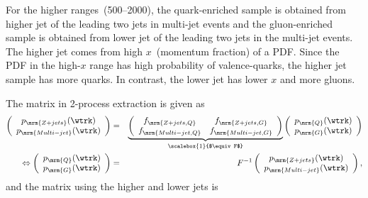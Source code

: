 For the higher \pt ranges~(500--2000\GeV), the quark-enriched sample is obtained from higher \abseta jet of the leading two jets in multi-jet events %
and the gluon-enriched sample is obtained from lower \abseta jet of the leading two jets in the multi-jet events. %
The higher \abseta jet comes from high $x$~(momentum fraction) of a PDF. %
Since the PDF in the high-$x$ range has high probability of valence-quarks, %
the higher \abseta jet sample has more quarks. %
In contrast, the lower \abseta jet has lower $x$ and more gluons. %

The matrix in 2-process extraction is given as 
\begin{eqnarray}
\label{eq:QG-matrix}
\left(\begin{array}{c} 
    p_{\mrm{Z+jets}}(\wtrk)\\ 
    p_{\mrm{Multi-jet}}(\wtrk)\\ 
    \end{array}\right)
    &=&
    \underbrace{
\left(\begin{array}{cc}
    f_{\mrm{Z+jets,Q}}&f_{\mrm{Z+jets,G}}\\
    f_{\mrm{Multi-jet,Q}}&f_{\mrm{Multi-jet,G}}\\
    \end{array}\right)
  }_{\scalebox{1}{$\equiv F$}}
\left(\begin{array}{c} 
    p_\mrm{Q}(\wtrk)\\ 
    p_\mrm{G}(\wtrk)\\ 
    \end{array}\right)
    \\
\label{eq:QG-invmatrix}
\Leftrightarrow
\left(\begin{array}{c} 
    p_\mrm{Q}(\wtrk)\\ 
    p_\mrm{G}(\wtrk)\\ 
    \end{array}\right)
    &=& F^{-1}
\left(\begin{array}{c} 
    p_{\mrm{Z+jets}}(\wtrk)\\ 
    p_{\mrm{Multi-jet}}(\wtrk)\\ 
    \end{array}\right),
\end{eqnarray}
and the matrix using the higher and lower \abseta jets is 
